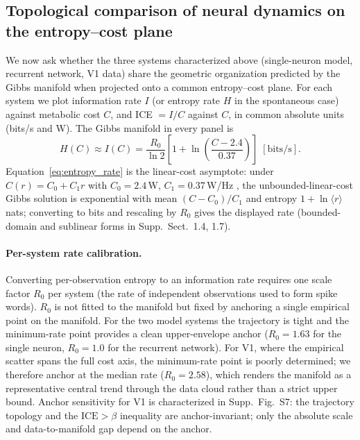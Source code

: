 \subsection{Topological comparison of neural dynamics on the entropy--cost plane}

We now ask whether the three systems characterized above (single-neuron model, recurrent network, V1 data) share the geometric organization predicted by the Gibbs manifold when projected onto a common entropy--cost plane.  For each system we plot information rate $I$ (or entropy rate $H$ in the spontaneous case) against metabolic cost $C$, and ICE $=I/C$ against $C$, in common absolute units (bits/s and W).  The Gibbs manifold in every panel is
\begin{equation}
H(C) \approx I(C) = \frac{R_0}{\ln 2}\left[1 + \ln\!\left(\frac{C-2.4}{0.37}\right)\right] \; [\text{bits/s}].
\label{eq:entropy_rate}
\end{equation}
Equation~\eqref{eq:entropy_rate} is the linear-cost asymptote: under $C(r)=C_0+C_1 r$ with $C_0=2.4$\,W, $C_1=0.37$\,W/Hz \cite{Yuguo2018Evaluating}, the unbounded-linear-cost Gibbs solution is exponential with mean $(C-C_0)/C_1$ and entropy $1+\ln\langle r\rangle$ nats; converting to bits and rescaling by $R_0$ gives the displayed rate (bounded-domain and sublinear forms in Supp.~Sect.~1.4, 1.7).

\paragraph{Per-system rate calibration.}
Converting per-observation entropy to an information rate requires one scale factor $R_0$ per system (the rate of independent observations used to form spike words).  $R_0$ is not fitted to the manifold but fixed by anchoring a single empirical point on the manifold.  For the two model systems the trajectory is tight and the minimum-rate point provides a clean upper-envelope anchor ($R_0=1.63$ for the single neuron, $R_0=1.0$ for the recurrent network).  For V1, where the empirical scatter spans the full cost axis, the minimum-rate point is poorly determined; we therefore anchor at the median rate ($R_0=2.58$), which renders the manifold as a representative central trend through the data cloud rather than a strict upper bound.  Anchor sensitivity for V1 is characterized in Supp.~Fig.~S7: the trajectory topology and the $\mathrm{ICE}>\beta$ inequality are anchor-invariant; only the absolute scale and data-to-manifold gap depend on the anchor.

